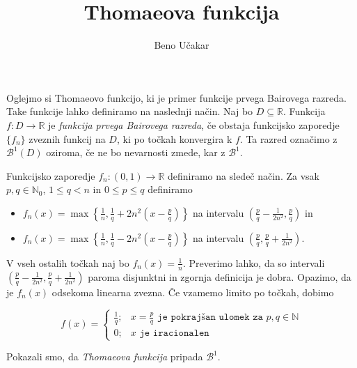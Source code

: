 \documentclass[a4paper, 12pt]{article}
\title{Thomaeova funkcija}
\author{Beno Učakar}
\date{}
\newcommand{\B}{\mathscr{B}^1}
\begin{document}
\maketitle

Oglejmo si Thomaeovo funkcijo, ki je primer funkcije prvega Bairovega razreda.
Take funkcije lahko definiramo na naslednji način.
Naj bo $D \subseteq \mathbb{R}$. Funkcija $f : D \rightarrow \mathbb{R}$ je \emph{funkcija prvega Bairovega razreda}, 
če obstaja funkcijsko zaporedje $\{f_n\}$ zveznih funkcij na $D$, ki po točkah konvergira k $f$. 
Ta razred označimo z $\B(D)$ oziroma, če ne bo nevarnosti zmede, kar z $\B$.

\begin{zgled*}
    Funkcijsko zaporedje $f_n: (0,1) \rightarrow \mathbb{R}$ definiramo na sledeč način.
    Za vsak $p,q \in \mathbb{N}_0$, $1 \le q < n$ in $0 \le p \le q$ definiramo
    \begin{itemize}
        \item \(f_n(x) = \max\left\{\frac{1}{n}, \frac{1}{q} + 2n^2\left(x - \frac{p}{q}\right)\right\}\) na intervalu \(\left(\frac{p}{q} - \frac{1}{2n^2}, \frac{p}{q}\right)\) in
        \item \(f_n(x) = \max\left\{\frac{1}{n}, \frac{1}{q} - 2n^2\left(x - \frac{p}{q}\right)\right\}\) na intervalu \(\left(\frac{p}{q}, \frac{p}{q} + \frac{1}{2n^2}\right)\).
    \end{itemize}
    V vseh ostalih točkah naj bo $f_n(x) = \frac{1}{n}$.
    Preverimo lahko, da so intervali $\left(\frac{p}{q} - \frac{1}{2n^2}, \frac{p}{q} + \frac{1}{2n^2}\right)$ paroma disjunktni in zgornja definicija je dobra.
    Opazimo, da je $f_n(x)$ odsekoma linearna zvezna. Če vzamemo limito po točkah, dobimo

    $$f(x)=\begin{cases}
        \frac{1}{q}; &x=\frac{p}{q} \texttt{ je pokrajšan ulomek za } p,q \in \mathbb{N} \\
        0; &x \texttt{ je iracionalen}
    \end{cases}$$

    Pokazali smo, da \emph{Thomaeova funkcija} pripada $\B$. 
\end{zgled*}


\nocite{counterexamples}


\end{document}
